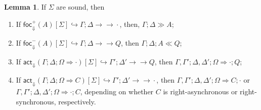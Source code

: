 \documentclass{article}
\theoremstyle{definition}
\newtheorem{lemma}{Lemma}
\newcommand{\fneuseqsymb}{
  \mathrel{\longrightarrow\!\!\!\!\!\!\!\!\longrightarrow}}
\newcommand{\fneuseq}[3]{#1 ; #2 \fneuseqsymb #3}
\newcommand{\frfrel}[1]{\textsf{foc}^+_{\Downarrow}(#1)}
\newcommand{\flfrel}[1]{\textsf{foc}^-_{\Downarrow}(#1)}
\newcommand{\factrel}[1]{\textsf{act}_{\Downarrow}(#1)}
\newcommand{\relj}[3]{#1 [#2] \hookrightarrow #3}
\newcommand{\btriseq}[4]{#1; #2; #3 \Longrightarrow #4}
\newcommand{\rfocseq}[3]{#1; #2 \gg #3}
\newcommand{\lfocseq}[4]{#1; #2; #3 \ll #4}
\begin{document}
\begin{lemma}\label{fsoundnesslemma}
  If $\Sigma$ are sound, then

  \begin{enumerate}
  \item If $\relj{\frfrel{A}}{\Sigma}{\fneuseq{\Gamma}{\Delta}{\cdot}}$,
    then, $\rfocseq{\Gamma}{\Delta}{A}$;
  \item If $\relj{\flfrel{A}}{\Sigma}{\fneuseq{\Gamma}{\Delta}{Q}}$,
    then $\lfocseq{\Gamma}{\Delta}{A}{Q}$;
  \item If
    $\relj{\factrel{\btriseq{\Gamma}{\Delta}{\Omega}{\cdot}}}{\Sigma}
    {\fneuseq{\Gamma'}{\Delta'}{Q}}$, then
    $\btriseq{\Gamma, \Gamma'}{\Delta, \Delta'}{\Omega}{\cdot ; Q}$;
  \item If
    $\relj{\factrel{\btriseq{\Gamma}{\Delta}{\Omega}{C}}}{\Sigma}
    {\fneuseq{\Gamma'}{\Delta'}{\cdot}}$, then
    $\btriseq{\Gamma, \Gamma'}{\Delta, \Delta'}{\Omega}{C ; \cdot}$ or
    $\btriseq{\Gamma, \Gamma'}{\Delta, \Delta'}{\Omega}{\cdot ; C}$, depending
    on whether $C$ is right-asynchronous or right-synchronous, respectively.
  \end{enumerate}
\end{lemma}
\end{document}
